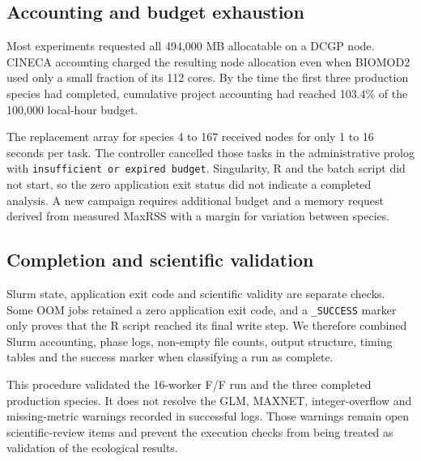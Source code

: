 \subsection{Accounting and budget exhaustion}

Most experiments requested all 494,000 MB allocatable on a DCGP node. CINECA accounting charged the resulting node allocation even when BIOMOD2 used only a small fraction of its 112 cores. By the time the first three production species had completed, cumulative project accounting had reached 103.4\% of the 100,000 local-hour budget.

The replacement array for species 4 to 167 received nodes for only 1 to 16 seconds per task. The controller cancelled those tasks in the administrative prolog with \texttt{insufficient or expired budget}. Singularity, R and the batch script did not start, so the zero application exit status did not indicate a completed analysis. A new campaign requires additional budget and a memory request derived from measured MaxRSS with a margin for variation between species.

\subsection{Completion and scientific validation}

Slurm state, application exit code and scientific validity are separate checks. Some OOM jobs retained a zero application exit code, and a \texttt{\_SUCCESS} marker only proves that the R script reached its final write step. We therefore combined Slurm accounting, phase logs, non-empty file counts, output structure, timing tables and the success marker when classifying a run as complete.

This procedure validated the 16-worker F/F run and the three completed production species. It does not resolve the GLM, MAXNET, integer-overflow and missing-metric warnings recorded in successful logs. Those warnings remain open scientific-review items and prevent the execution checks from being treated as validation of the ecological results.

